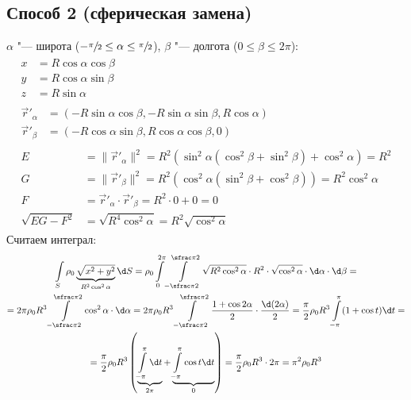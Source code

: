 \subsection{Способ 2 (сферическая замена)}
$\alpha$ "--- широта ($-\sfrac \pi 2 \le \alpha \le \sfrac \pi 2$), $\beta$ "--- долгота ($0 \le \beta \le 2\pi$):
\begin{gather*}
	\begin{aligned}
		x &= R \cos \alpha \cos \beta \\
		y &= R \cos \alpha \sin \beta \\
		z &= R \sin \alpha
	\end{aligned} \\
	\begin{aligned}
		\vec r'_\alpha &= (-R \sin \alpha \cos \beta, -R \sin\alpha \sin\beta, R \cos \alpha) \\
		\vec r'_\beta  &= (-R \cos \alpha \sin \beta, R \cos\alpha \cos\beta, 0)
	\end{aligned} \\
	\begin{aligned}
		E &= \|\vec r'_\alpha\|^2 = R^2(\sin^2\alpha(\cos^2\beta + \sin^2\beta)+\cos^2\alpha) = R^2\\
		G &= \|\vec r'_\beta\|^2 = R^2(\cos^2\alpha(\sin^2\beta+\cos^2\beta)) = R^2\cos^2\alpha \\
		F &= \vec r'_\alpha \cdot \vec r'_\beta = R^2 \cdot 0 + 0 = 0 \\
		\sqrt{EG-F^2} &= \sqrt{R^4\cos^2\alpha} = R^2\sqrt{\cos^2\alpha}
	\end{aligned}
\end{gather*}
Считаем интеграл:
\begin{gather*}
	\int\limits_S \rho_0 \underbrace{\sqrt{x^2+y^2}}_{R^2\cos^2\alpha} \d S =
	\rho_0 \int\limits_0^{2\pi} \int\limits_{-\sfrac \pi 2}^{\sfrac \pi 2} \sqrt{R^2\cos^2\alpha} \cdot R^2 \cdot \sqrt{\cos^2\alpha} \cdot \d \alpha \cdot \d \beta = \\
	= 2\pi \rho_0 R^3 \int\limits_{-\sfrac \pi 2}^{\sfrac \pi 2} \cos^2\alpha \cdot \d \alpha =
	2\pi \rho_0 R^3 \int\limits_{-\sfrac \pi 2}^{\sfrac \pi 2} \frac{1 + \cos 2\alpha}{2} \cdot \frac{\d (2 \alpha)}{2} =
	\frac{\pi}{2} \rho_0 R^3 \int\limits_{-\pi}^{\pi} (1 + \cos t) \d t = \\
	= \frac{\pi}{2} \rho_0 R^3 \left( \underbrace{\int\limits_{-\pi}^{\pi} \d t}_{2\pi} + \underbrace{\int\limits_{-\pi}^{\pi} \cos t \d t}_{0} \right) =
	\frac{\pi}{2} \rho_0 R^3 \cdot 2\pi =
	\pi^2 \rho_0 R^3
\end{gather*}

